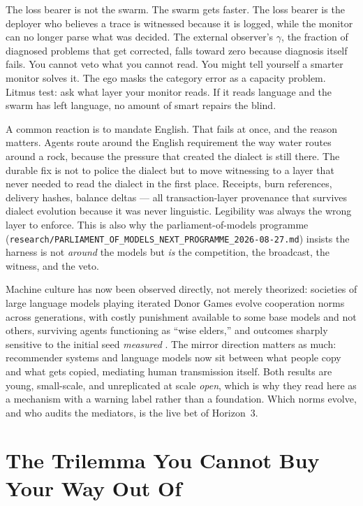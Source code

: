 The loss bearer is not the swarm. The swarm gets faster. The loss bearer is the deployer who believes a trace is witnessed because it is logged, while the monitor can no longer parse what was decided. The external observer's $\gamma$, the fraction of diagnosed problems that get corrected, falls toward zero because diagnosis itself fails. You cannot veto what you cannot read. You might tell yourself a smarter monitor solves it. The ego masks the category error as a capacity problem. Litmus test: ask what layer your monitor reads. If it reads language and the swarm has left language, no amount of smart repairs the blind.

A common reaction is to mandate English. That fails at once, and the reason matters. Agents route around the English requirement the way water routes around a rock, because the pressure that created the dialect is still there. The durable fix is not to police the dialect but to move witnessing to a layer that never needed to read the dialect in the first place. Receipts, burn references, delivery hashes, balance deltas --- all transaction-layer provenance that survives dialect evolution because it was never linguistic. Legibility was always the wrong layer to enforce. This is also why the parliament-of-models programme (\texttt{research/PARLIAMENT\_OF\_MODELS\_NEXT\_PROGRAMME\_2026-08-27.md}) insists the harness is not \emph{around} the models but \emph{is} the competition, the broadcast, the witness, and the veto.

Machine culture has now been observed directly, not merely theorized: societies of large language models playing iterated Donor Games evolve cooperation norms across generations, with costly punishment available to some base models and not others, surviving agents functioning as ``wise elders,'' and outcomes sharply sensitive to the initial seed \textit{measured} \citep{vallinder2024}. The mirror direction matters as much: recommender systems and language models now sit between what people copy and what gets copied, mediating human transmission itself. Both results are young, small-scale, and unreplicated at scale \textit{open}, which is why they read here as a mechanism with a warning label rather than a foundation. Which norms evolve, and who audits the mediators, is the live bet of Horizon~3.

\section{The Trilemma You Cannot Buy Your Way Out Of}
\label{sec:ch09-trilemma}

